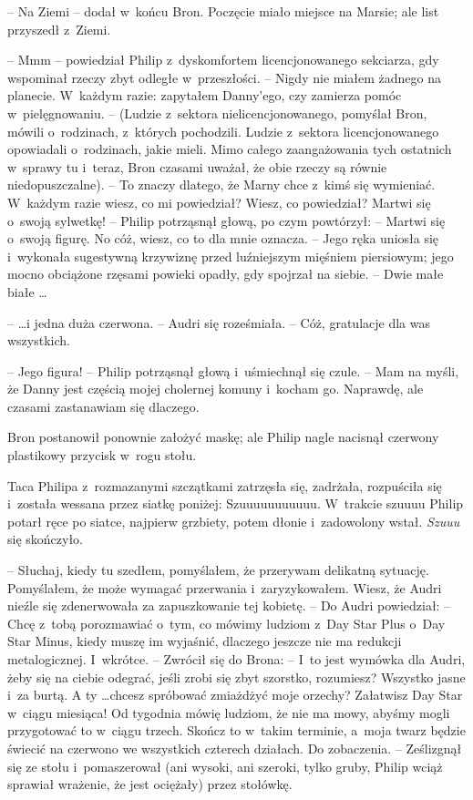 \documentclass[oneside,polish,11pt,rmheadings]{mwbk}
\begin{document}
-- Na Ziemi -- dodał w~końcu Bron. Poczęcie miało miejsce na Marsie; ale list przyszedł z~Ziemi. 

-- Mmm -- powiedział Philip z~dyskomfortem licencjonowanego sekciarza, gdy wspominał rzeczy zbyt odległe w~przeszłości.  -- Nigdy nie miałem żadnego na planecie. W~każdym razie: zapytałem Danny'ego, czy zamierza pomóc w~pielęgnowaniu. -- (Ludzie z~sektora nielicencjonowanego, pomyślał Bron, mówili o~rodzinach, z~których pochodzili. Ludzie z~sektora licencjonowanego opowiadali o~rodzinach, jakie mieli. Mimo całego zaangażowania tych ostatnich w~sprawy tu i~teraz, Bron czasami uważał, że obie rzeczy są równie niedopuszczalne). -- To znaczy dlatego, że Marny chce z~kimś się wymieniać. W~każdym razie wiesz, co mi powiedział?  Wiesz, co powiedział? Martwi się o~swoją sylwetkę! -- Philip potrząsnął głową, po czym powtórzył: -- Martwi się o~swoją figurę. No cóż, wiesz, co to dla mnie oznacza. -- Jego ręka uniosła się i~wykonała sugestywną krzywiznę przed luźniejszym mięśniem piersiowym; jego mocno obciążone rzęsami powieki opadły, gdy spojrzał na siebie. -- Dwie małe białe \ldots  

--  \ldots i jedna duża czerwona. -- Audri się roześmiała. -- Cóż, gratulacje dla was wszystkich. 

-- Jego figura! -- Philip potrząsnął głową i~uśmiechnął się czule. -- Mam na myśli, że Danny jest częścią mojej cholernej komuny i~kocham go. Naprawdę, ale czasami zastanawiam się dlaczego.  

Bron postanowił ponownie założyć maskę; ale Philip nagle nacisnął czerwony plastikowy przycisk w~rogu stołu. 

Taca Philipa z~rozmazanymi szczątkami zatrzęsła się, zadrżała, rozpuściła się i~została wessana przez siatkę poniżej: Szuuuuuuuuuuu. W~trakcie szuuuu Philip potarł ręce po siatce, najpierw grzbiety, potem dłonie i~zadowolony wstał. \textit{Szuuu }się skończyło.  

-- Słuchaj, kiedy tu szedłem, pomyślałem, że przerywam delikatną sytuację. Pomyślałem, że może wymagać przerwania i~zaryzykowałem. Wiesz, że Audri nieźle się zdenerwowała za zapuszkowanie tej kobietę. -- Do Audri powiedział: -- Chcę z~tobą porozmawiać o~tym, co mówimy ludziom z~Day Star Plus o~Day Star Minus, kiedy muszę im wyjaśnić, dlaczego jeszcze nie ma redukcji metalogicznej. I~wkrótce. -- Zwrócił się do Brona: -- I~to jest wymówka dla Audri, żeby się na ciebie odegrać, jeśli zrobi się zbyt szorstko, rozumiesz? Wszystko jasne i~za burtą. A ty \ldots  chcesz spróbować zmiażdżyć moje orzechy? Załatwisz Day Star w~ciągu miesiąca! Od tygodnia mówię ludziom, że nie ma mowy, abyśmy mogli przygotować to w~ciągu trzech. Skończ to w~takim terminie, a~moja twarz będzie świecić na czerwono we wszystkich czterech działach. Do zobaczenia. -- Ześlizgnął się ze stołu i~pomaszerował (ani wysoki, ani szeroki, tylko gruby, Philip wciąż sprawiał wrażenie, że jest ociężały) przez stołówkę. 
\end{document}
